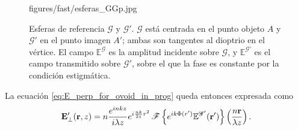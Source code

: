 \begin{figure}[!htbp]
  \centering
    {figures/fast/esferas_GGp.jpg}
  \caption{Esferas de referencia $\mathscr G$ y $\mathscr G'$. $\mathscr G$ está centrada en el punto objeto $A$ y $\mathscr G'$ en el punto imagen $A'$; ambas son tangentes al dioptrio en el vértice. El campo $\mathbb E^{\mathscr G}$ es la amplitud incidente sobre $\mathscr G$, y $\mathbb E^{\mathscr G'}$ es el campo transmitido sobre $\mathscr G'$, sobre el que la fase es constante por la condición estigmática.}
  \label{fig:EGs}
\end{figure}

La ecuación \eqref{eq:E_perp_for_ovoid_in_prog} queda entonces expresada como
\begin{equation}
\vb{E}'_\perp(\vb r,z)
=
n\frac{e^{inkz}}{i\lambda z}e^{i\frac{nk}{2z}r^2}
\,
\mathscr F
\left\{
e^{ik\Phi(r')} \mathbb E^{\mathscr G'}(\vb r')
\right\}
\left(
\frac{n\vb r}{\lambda z}
\right).
\label{eq:E_field_perp_no_phase_replacement}
\end{equation}

